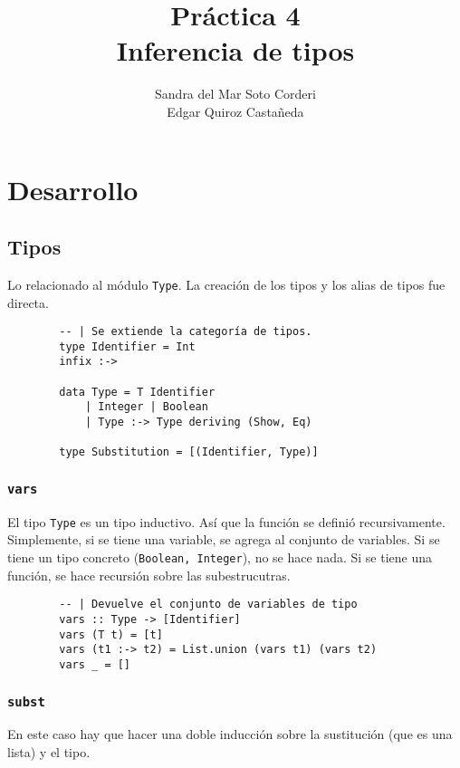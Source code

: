 \documentclass{article}
\title{
    Práctica 4 \\
    Inferencia de tipos
}
\author{
    Sandra del Mar Soto Corderi \\
    Edgar Quiroz Castañeda
}
\begin{document}
    \maketitle

    \section{Desarrollo}

    \subsection{Tipos}

    Lo relacionado al módulo \texttt{Type}. La creación de los tipos y los alias de tipos fue directa.

    \begin{verbatim}
        -- | Se extiende la categoría de tipos.
        type Identifier = Int
        infix :->

        data Type = T Identifier
            | Integer | Boolean
            | Type :-> Type deriving (Show, Eq)
            
        type Substitution = [(Identifier, Type)]
    \end{verbatim}

    \subsubsection{\texttt{vars}}

    El tipo \texttt{Type} es un tipo inductivo. Así que la función se definió
    recursivamente.
    Simplemente, si se tiene una variable, se agrega al conjunto de variables.
    Si se tiene un tipo concreto (\texttt{Boolean, Integer}), no se hace nada.
    Si se tiene una función, se hace recursión sobre las subestrucutras.

    \begin{verbatim}
        -- | Devuelve el conjunto de variables de tipo
        vars :: Type -> [Identifier]
        vars (T t) = [t]
        vars (t1 :-> t2) = List.union (vars t1) (vars t2)
        vars _ = []
    \end{verbatim}

    \subsubsection{\texttt{subst}}

    En este caso hay que hacer una doble inducción sobre la sustitución (que es
    una lista) y el tipo.
\end{document}

